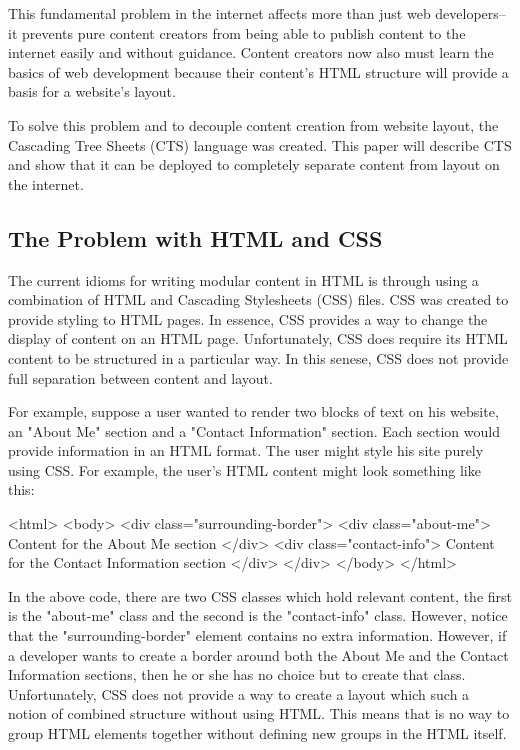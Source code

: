 \documentclass[12pt]{article}
\begin{document}
This fundamental problem in the internet affects more than just web developers--it prevents pure content creators from being able to publish content to the internet easily and without guidance. Content creators now also must learn the basics of web development because their content's HTML structure will provide a basis for a website's layout.

To solve this problem and to decouple content creation from website layout, the Cascading Tree Sheets (CTS) language was created. This paper will describe CTS and show that it can be deployed to completely separate content from layout on the internet.

\subsection{The Problem with HTML and CSS}

The current idioms for writing modular content in HTML is through using a combination of HTML and Cascading Stylesheets (CSS) files. CSS was created to provide styling to HTML pages. In essence, CSS provides a way to change the display of content on an HTML page. Unfortunately, CSS does require its HTML content to be structured in a particular way. In this senese, CSS does not provide full separation between content and layout.

For example, suppose a user wanted to render two blocks of text on his website, an "About Me" section and a "Contact Information" section. Each section would provide information in an HTML format. The user might style his site purely using CSS. For example, the user's HTML content might look something like this:

\begin{code}
<html>
  <body>
    <div class="surrounding-border">
      <div class="about-me">
        Content for the About Me section
      </div>
      <div class="contact-info">
        Content for the Contact Information section
      </div>
    </div>
  </body>
</html>
\end{code}

In the above code, there are two CSS classes which hold relevant content, the first is the "about-me" class and the second is the "contact-info" class. However, notice that the "surrounding-border" element contains no extra information. However, if a developer wants to create a border around both the About Me and the Contact Information sections, then he or she has no choice but to create that class. Unfortunately, CSS does not provide a way to create a layout which such a notion of combined structure without using HTML. This means that is no way to group HTML elements together without defining new groups in the HTML itself. 
\end{document}
